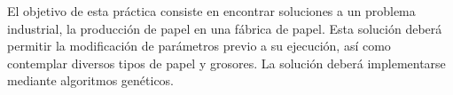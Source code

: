 El objetivo de esta práctica consiste en encontrar soluciones a un problema industrial, la producción de papel en una fábrica de papel. Esta solución deberá permitir la modificación de parámetros previo a su ejecución, así como contemplar diversos tipos de papel y grosores. La solución deberá implementarse mediante algoritmos genéticos.
